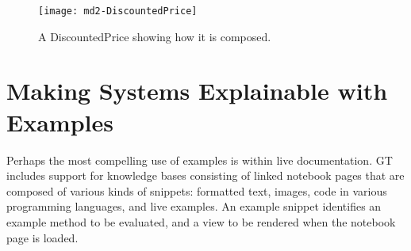 \documentclass[acmsmall,screen,authorversion,nonacm]{acmart} %
\newcommand\ac[1]{\nbc{AC}{#1}{teal}}
\begin{document}
\begin{figure}[h]
  \texttt{[image: md2-DiscountedPrice]}
  \caption{A DiscountedPrice showing how it is composed.}
  \label{fig:DiscountedPrice}
\end{figure}

\section{Making Systems Explainable with Examples}\label{sec:explainable}

%



Perhaps the most compelling use of examples is within live documentation.
GT includes support for knowledge bases consisting of linked notebook pages that are composed of various kinds of snippets: formatted text, images, code in various programming languages, and live examples.
An example snippet identifies an example method to be evaluated, and a view to be rendered when the notebook page is loaded.
\end{document}
